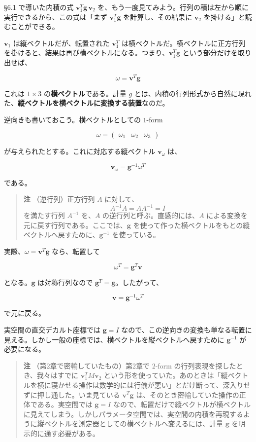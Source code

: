 \documentclass[a4paper,12pt,openany]{book}
\begin{document}
§6.1 で導いた内積の式 \(\mathbf{v}_1^T \mathbf{g} \,\mathbf{v}_2\)
を、もう一度見てみよう。行列の積は左から順に実行できるから、この式は「まず
\(\mathbf{v}_1^T \mathbf{g}\) を計算し、その結果に \(\mathbf{v}_2\)
を掛ける」と読むことができる。

\(\mathbf{v}_1\) は縦ベクトルだが、転置された \(\mathbf{v}_1^T\)
は横ベクトルだ。横ベクトルに正方行列を掛けると、結果は再び横ベクトルになる。つまり、\(\mathbf{v}_1^T \mathbf{g}\)
という部分だけを取り出せば、

\[\omega = \mathbf{v}^T \mathbf{g}\]

これは \(1 \times 3\) の\textbf{横ベクトル}である。計量 \(g\)
とは、内積の行列形式から自然に現れた、\textbf{縦ベクトルを横ベクトルに変換する装置}なのだ。

逆向きも書いておこう。横ベクトルとしての \(1\)-form

\[
\omega =
\begin{pmatrix}
\omega_1 & \omega_2 & \omega_3
\end{pmatrix}
\]

が与えられたとする。これに対応する縦ベクトル \(\mathbf{v}_\omega\) は、

\[
\mathbf{v}_\omega = \mathbf{g}^{-1}\omega^T
\]

である。

\begin{quote}
\textbf{注} （逆行列）正方行列 \(A\) に対して、 \[
A^{-1}A = AA^{-1} = I
\] を満たす行列 \(A^{-1}\) を、\(A\) の逆行列と呼ぶ。直感的には、\(A\)
による変換を元に戻す行列である。ここでは、\(\mathbf{g}\)
を使って作った横ベクトルをもとの縦ベクトルへ戻すために、\(\mathbf{g}^{-1}\)
を使っている。
\end{quote}

実際、\(\omega = \mathbf{v}^T\mathbf{g}\) なら、転置して

\[
\omega^T = \mathbf{g}^T\mathbf{v}
\]

となる。\(\mathbf{g}\) は対称行列なので
\(\mathbf{g}^T = \mathbf{g}\)。したがって、

\[
\mathbf{v} = \mathbf{g}^{-1}\omega^T
\]

で元に戻る。

実空間の直交デカルト座標では \(\mathbf{g}=I\)
なので、この逆向きの変換も単なる転置に見える。しかし一般の座標では、横ベクトルを縦ベクトルへ戻すために
\(\mathbf{g}^{-1}\) が必要になる。

\begin{quote}
\textbf{注} （第2章で密輸していたもの）第2章で \(2\)-form
の行列表現を探したとき、我々はすでに \(\mathbf{v}_1^T M \mathbf{v}_2\)
という形を使っていた。あのときは「縦ベクトルを横に寝かせる操作は数学的には行儀が悪い」とだけ断って、深入りせずに押し通した。いま見ている
\(\mathbf{v}^T\mathbf{g}\)
は、そのとき密輸していた操作の正体である。実空間では \(\mathbf{g}=I\)
なので、転置だけで縦ベクトルが横ベクトルに見えてしまう。しかしパラメータ空間では、実空間の内積を再現するように縦ベクトルを測定器としての横ベクトルへ変えるには、計量
\(\mathbf{g}\) を明示的に通す必要がある。
\end{quote}
\end{document}
